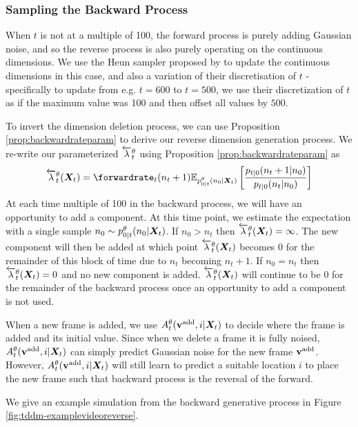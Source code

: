 \subsubsection{Sampling the Backward Process}

When $t$ is not at a multiple of 100, the forward process is purely adding Gaussian noise, and so the reverse process is also purely operating on the continuous dimensions. We use the Heun sampler proposed by \cite{karras2022elucidating} to update the continuous dimensions in this case, and also a variation of their discretisation of $t$ - specifically to update from e.g. $t=600$ to $t=500$, we use their discretization of $t$ as if the maximum value was 100 and then offset all values by $500$. 

To invert the dimension deletion process, we can use Proposition \ref{prop:backwardrateparam} to derive our reverse dimension generation process. We re-write our parameterized $\overleftarrow{\lambda}_t^\theta$ using Proposition \ref{prop:backwardrateparam} as 
\begin{equation}
    \backwardrate_t^\theta(\mX_t) = \forwardrate_t(n_t + 1) \mathbb{E}_{p_{0|t}^\theta(n_0 | \mX_t)} \left[ \frac{p_{t|0}(n_t + 1 | n_0)}{p_{t|0}(n_t | n_0)}\right]
\end{equation}
At each time multiple of 100 in the backward process, we will have an opportunity to add a component. At this time point, we estimate the expectation with a single sample $n_0 \sim p_{0|t}^\theta(n_0 | {\bm{X}}_t)$. If $n_0 > n_t$ then $\overleftarrow{\lambda}_t^\theta({\bm{X}}_t) = \infty$. The new component will then be added at which point $\overleftarrow{\lambda}_t^\theta({\bm{X}}_t)$ becomes $0$ for the remainder of this block of time due to $n_t$ becoming $n_t+1$. If $n_0 = n_t$ then $\overleftarrow{\lambda}_t^\theta({\bm{X}}_t) = 0$ and no new component is added. $\overleftarrow{\lambda}_t^\theta({\bm{X}}_t)$ will continue to be $0$ for the remainder of the backward process once an opportunity to add a component is not used.

When a new frame is added, we use $A_t^\theta({\mathbf{v}}^{\textup{add}}, i | {\bm{X}}_t)$ to decide where the frame is added and its initial value. Since when we delete a frame it is fully noised, $A_t^\theta({\mathbf{v}}^{\textup{add}}, i | {\bm{X}}_t)$ can simply predict Gaussian noise for the new frame ${\mathbf{v}}^{\textup{add}}$. However, $A_t^\theta({\mathbf{v}}^{\textup{add}}, i | {\bm{X}}_t)$ will still learn to predict a suitable location $i$ to place the new frame such that backward process is the reversal of the forward.

We give an example simulation from the backward generative process in Figure \ref{fig:tddm-examplevideoreverse}.

